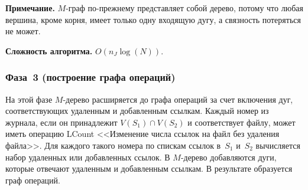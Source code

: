 \begin{multicols}{2}
      \smallskip

\noindent
{\sf \textbf{Примечание.} 
$M$-граф по-прежнему представляет собой 
дерево, потому что любая вершина, кроме корня, имеет только одну входящую 
дугу, а связность потеряться не может.}


      \smallskip
      
      \noindent
      \textbf{Сложность алгоритма.} $O(n_J \log (N))$.

\subsubsection{Фаза~3 (построение графа операций)}  %

      На этой фазе $M$-дерево расширяется до графа операций  за счет 
включения дуг, соответствующих удаленным и добавленным ссылкам. Каж\-дый 
номер из журнала, если он принадлежит $V(S_1)\cap V(S_2)$ и соответствует 
файлу, может иметь операцию LCount <<Изменение числа ссылок на файл без 
удаления файла>>. Для каждого такого номера по спискам ссылок в~$S_1$ 
и~$S_2$ вычисляется набор удаленных или добавленных ссылок. В $M$-дерево 
добавляются дуги, которые отвечают удаленным и добавленным ссылкам. В 
результате образуется граф операций. 
      
            \smallskip
            

\end{multicols}
